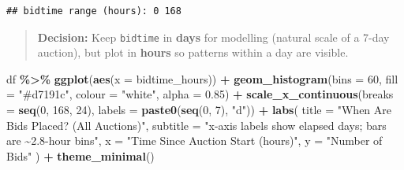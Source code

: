 \documentclass[
]{article}
\newenvironment{Shaded}{\begin{snugshade}}{\end{snugshade}}
\newcommand{\AttributeTok}[1]{\textcolor[rgb]{0.13,0.29,0.53}{#1}}
\newcommand{\CommentTok}[1]{\textcolor[rgb]{0.56,0.35,0.01}{\textit{#1}}}
\newcommand{\DecValTok}[1]{\textcolor[rgb]{0.00,0.00,0.81}{#1}}
\newcommand{\FloatTok}[1]{\textcolor[rgb]{0.00,0.00,0.81}{#1}}
\newcommand{\FunctionTok}[1]{\textcolor[rgb]{0.13,0.29,0.53}{\textbf{#1}}}
\newcommand{\NormalTok}[1]{#1}
\newcommand{\OtherTok}[1]{\textcolor[rgb]{0.56,0.35,0.01}{#1}}
\newcommand{\SpecialCharTok}[1]{\textcolor[rgb]{0.81,0.36,0.00}{\textbf{#1}}}
\newcommand{\StringTok}[1]{\textcolor[rgb]{0.31,0.60,0.02}{#1}}
\begin{document}
\begin{Shaded}
\end{Shaded}

\begin{verbatim}
## bidtime range (hours): 0 168
\end{verbatim}

\begin{quote}
\textbf{Decision:} Keep \texttt{bidtime} in \textbf{days} for modelling
(natural scale of a 7-day auction), but plot in \textbf{hours} so
patterns within a day are visible.
\end{quote}

\begin{Shaded}
\begin{Highlighting}[]
\NormalTok{df }\SpecialCharTok{\%\textgreater{}\%}
  \FunctionTok{ggplot}\NormalTok{(}\FunctionTok{aes}\NormalTok{(}\AttributeTok{x =}\NormalTok{ bidtime\_hours)) }\SpecialCharTok{+}
  \FunctionTok{geom\_histogram}\NormalTok{(}\AttributeTok{bins =} \DecValTok{60}\NormalTok{, }\AttributeTok{fill =} \StringTok{"\#d7191c"}\NormalTok{, }\AttributeTok{colour =} \StringTok{"white"}\NormalTok{, }\AttributeTok{alpha =} \FloatTok{0.85}\NormalTok{) }\SpecialCharTok{+}
  \FunctionTok{scale\_x\_continuous}\NormalTok{(}\AttributeTok{breaks =} \FunctionTok{seq}\NormalTok{(}\DecValTok{0}\NormalTok{, }\DecValTok{168}\NormalTok{, }\DecValTok{24}\NormalTok{),}
                     \AttributeTok{labels =} \FunctionTok{paste0}\NormalTok{(}\FunctionTok{seq}\NormalTok{(}\DecValTok{0}\NormalTok{, }\DecValTok{7}\NormalTok{), }\StringTok{"d"}\NormalTok{)) }\SpecialCharTok{+}
  \FunctionTok{labs}\NormalTok{(}
    \AttributeTok{title    =} \StringTok{"When Are Bids Placed? (All Auctions)"}\NormalTok{,}
    \AttributeTok{subtitle =} \StringTok{"x{-}axis labels show elapsed days; bars are \textasciitilde{}2.8{-}hour bins"}\NormalTok{,}
    \AttributeTok{x        =} \StringTok{"Time Since Auction Start (hours)"}\NormalTok{,}
    \AttributeTok{y        =} \StringTok{"Number of Bids"}
\NormalTok{  ) }\SpecialCharTok{+}
  \FunctionTok{theme\_minimal}\NormalTok{()}
\end{Highlighting}
\end{Shaded}
\end{document}
